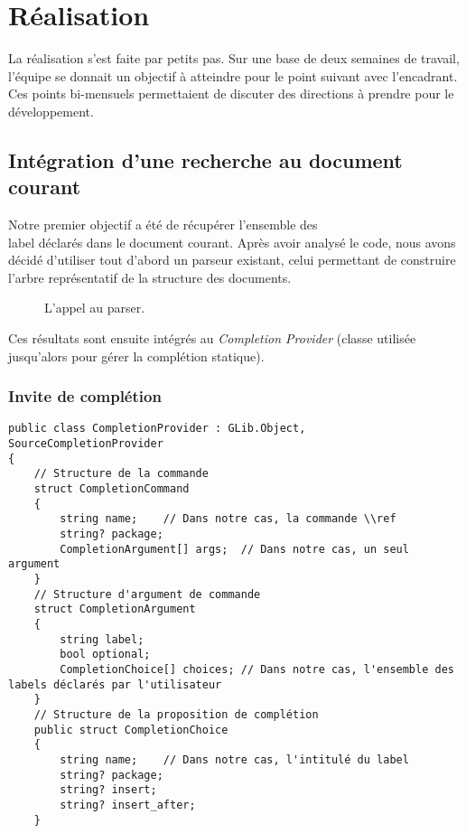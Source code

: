 \documentclass[a4paper,11pt]{report}
\begin{document}
\chapter{Réalisation}
La réalisation s'est faite par petits pas. Sur une base de deux semaines de travail, l'équipe se donnait un objectif à atteindre pour le point suivant avec l'encadrant.
Ces points bi-mensuels permettaient de discuter des directions à prendre pour le développement.

\section{Intégration d'une recherche au document courant}
Notre premier objectif a été de récupérer l'ensemble des \\label déclarés dans le document courant. Après avoir analysé le code, nous avons décidé d'utiliser tout d'abord un parseur existant, celui permettant de construire l'arbre représentatif de la structure des documents.

\begin{figure}[h]
\label{fig:flow_parser_call}
\centering

\caption{L'appel au parser.}
\end{figure}

Ces résultats sont ensuite intégrés au \textit{Completion Provider} (classe utilisée jusqu'alors pour gérer la complétion statique).

\subsection{Invite de complétion}

\begin{lstlisting}[frame=single]
public class CompletionProvider : GLib.Object, SourceCompletionProvider
{
    // Structure de la commande
    struct CompletionCommand
    {
        string name;    // Dans notre cas, la commande \\ref
        string? package;
        CompletionArgument[] args;  // Dans notre cas, un seul argument
    }
    // Structure d'argument de commande
    struct CompletionArgument
    {
        string label;
        bool optional;
        CompletionChoice[] choices; // Dans notre cas, l'ensemble des labels déclarés par l'utilisateur
    }
    // Structure de la proposition de complétion
    public struct CompletionChoice
    {
        string name;    // Dans notre cas, l'intitulé du label
        string? package;
        string? insert;
        string? insert_after;
    }
\end{lstlisting}
\end{document}
